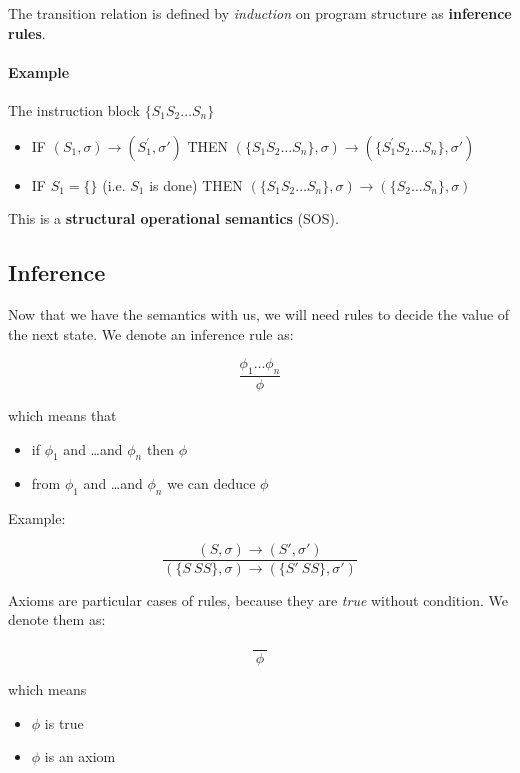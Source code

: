 \documentclass[12pt, a4paper]{book}
\begin{document}
The transition relation is defined by \textit{induction} on program structure as
\textbf{inference rules}. \newline

\paragraph{Example} The instruction block $\{S_1 S_2 \ldots S_n\}$

\begin{itemize}
    \item IF $(S_1, \sigma) \longrightarrow (S_{1}^{'},\sigma')$ THEN
    $(\{S_1S_2\ldots S_n\}, \sigma) \longrightarrow (\{S_1^{'}S_2\ldots S_n\},\sigma')$
    \item IF $S_1 = \{\}$ (i.e. $S_1$ is done) THEN $(\{S_1S_2\ldots S_n\},\sigma) \longrightarrow (\{S_2\ldots S_n\}, \sigma)$
\end{itemize}

This is a \textbf{structural operational semantics} (SOS).

\subsection{Inference}
\label{sub:Inference}

Now that we have the semantics with us, we will need rules to decide the value
of the next state. We denote an inference rule as:

$$\frac{\phi_{1} \ldots \phi_{n}}{\phi}$$

which means that

\begin{itemize}
    \item if $\phi_1$ and \ldots and $\phi_n$ then $\phi$
    \item from $\phi_1$ and \ldots and $\phi_n$ we can deduce $\phi$
\end{itemize}

Example:

$$
\frac{(S,\sigma) \longrightarrow (S', \sigma')}
{(\{S\ SS\},\sigma) \longrightarrow (\{S'\ SS\}, \sigma')}
$$

Axioms are particular cases of rules, because they are \textit{true} without
condition. We denote them as:

$$
\frac{}
{\ \phi \ }
$$

which means

\begin{itemize}
    \item $\phi$ is true
    \item $\phi$ is an axiom
\end{itemize}
\end{document}
